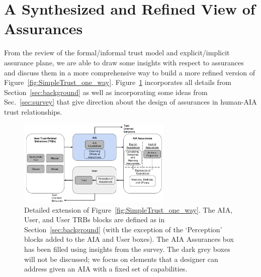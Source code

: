 \section{A Synthesized and Refined View of Assurances} \label{sec:synthesis}
    From the review of the formal/informal trust model and explicit/implicit assurance plane, we are able to draw some insights with respect to assurances and discuss them in a more comprehensive way to build a more refined version of Figure~\ref{fig:SimpleTrust_one_way}. Figure~\ref{fig:refined_assurances} incorporates all details from Section~\ref{sec:background} as well as incorporating some ideas from Sec.~\ref{sec:survey} that give direction about the design of assurances in human-AIA trust relationships. %

    \begin{figure}[htbp]
        \centering
        \includegraphics[width=0.65\textwidth]{Figures/RefinedTrust_one_way}
        \caption{Detailed extension of Figure~\ref{fig:SimpleTrust_one_way}. The AIA, User, and User TRBs blocks are defined as in Section~\ref{sec:background} (with the exception of the `Perception' blocks added to the AIA and User boxes). The AIA Assurances box has been filled using insights from the survey. The dark grey boxes will not be discussed; we focus on elements that a designer can address given an AIA with a fixed set of capabilities.}
        \label{fig:refined_assurances}
    \end{figure}

